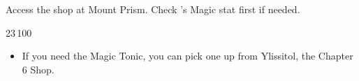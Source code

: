 Access the shop at Mount Prism. Check \robin's Magic stat first if needed.


\begin{shop}{23\,100}
\begin{itemize}
	\robinf
	\begin{itemize}
		\item Forge \textbf{Thoron}:
		\begin{itemize}
			\item 38 Magic: 5 Might, 3 Crit. Use a Magic Tonic.
			\item 39 Magic: 4 Might, 4 Crit. Use a Magic Tonic.
			\item 40 Magic: 3 Might, 5 Crit. Use a Magic Tonic.
			\item 41 Magic: 4 Might, 4 Crit
			\item 42 Magic: 3 Might, 5 Crit
			\item 43 Magic: 2 Might, 1 Hit, 5 Crit
			\item 44 Magic: 1 Might, 2 Hit, 5 Crit
			\item 45 Magic: 3 Hit, 5 Crit
			\item 46 Magic: 3 Hit, 5 Crit
		\end{itemize}
	\end{itemize}
	\item If you need the Magic Tonic, you can pick one up from Ylissitol, the Chapter 6 Shop.
\end{itemize}
\end{shop}